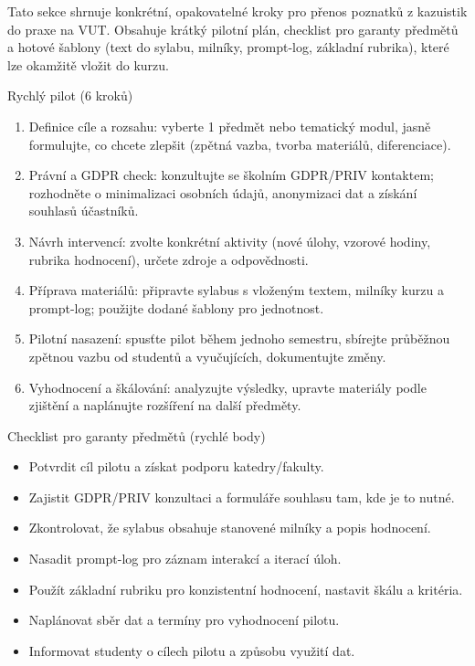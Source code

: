 Tato sekce shrnuje konkrétní, opakovatelné kroky pro přenos poznatků z kazuistik do praxe na VUT. Obsahuje krátký pilotní plán, checklist pro garanty předmětů a hotové šablony (text do sylabu, milníky, prompt-log, základní rubrika), které lze okamžitě vložit do kurzu.

\bigskip

Rychlý pilot (6 kroků)
\begin{enumerate}
  \item Definice cíle a rozsahu: vyberte 1 předmět nebo tematický modul, jasně formulujte, co chcete zlepšit (zpětná vazba, tvorba materiálů, diferenciace).
  \item Právní a GDPR check: konzultujte se školním GDPR/PRIV kontaktem; rozhodněte o minimalizaci osobních údajů, anonymizaci dat a získání souhlasů účastníků.
  \item Návrh intervencí: zvolte konkrétní aktivity (nové úlohy, vzorové hodiny, rubrika hodnocení), určete zdroje a odpovědnosti.
  \item Příprava materiálů: připravte sylabus s vloženým textem, milníky kurzu a prompt-log; použijte dodané šablony pro jednotnost.
  \item Pilotní nasazení: spusťte pilot během jednoho semestru, sbírejte průběžnou zpětnou vazbu od studentů a vyučujících, dokumentujte změny.
  \item Vyhodnocení a škálování: analyzujte výsledky, upravte materiály podle zjištění a naplánujte rozšíření na další předměty.
\end{enumerate}

\bigskip

Checklist pro garanty předmětů (rychlé body)
\begin{itemize}
  \item Potvrdit cíl pilotu a získat podporu katedry/fakulty.
  \item Zajistit GDPR/PRIV konzultaci a formuláře souhlasu tam, kde je to nutné.
  \item Zkontrolovat, že sylabus obsahuje stanovené milníky a popis hodnocení.
  \item Nasadit prompt-log pro záznam interakcí a iterací úloh.
  \item Použít základní rubriku pro konzistentní hodnocení, nastavit škálu a kritéria.
  \item Naplánovat sběr dat a termíny pro vyhodnocení pilotu.
  \item Informovat studenty o cílech pilotu a způsobu využití dat.
\end{itemize}

